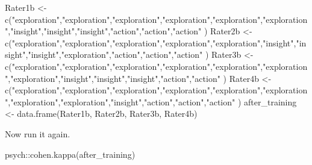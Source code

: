 \documentclass[
  english,
]{book}
\newenvironment{Shaded}{\begin{snugshade}}{\end{snugshade}}
\newcommand{\FunctionTok}[1]{\textcolor[rgb]{0.00,0.00,0.00}{#1}}
\newcommand{\NormalTok}[1]{#1}
\newcommand{\OtherTok}[1]{\textcolor[rgb]{0.56,0.35,0.01}{#1}}
\newcommand{\SpecialCharTok}[1]{\textcolor[rgb]{0.00,0.00,0.00}{#1}}
\newcommand{\StringTok}[1]{\textcolor[rgb]{0.31,0.60,0.02}{#1}}
\begin{document}
\begin{Shaded}
\begin{Highlighting}[]
\NormalTok{Rater1b }\OtherTok{\textless{}{-}} \FunctionTok{c}\NormalTok{(}\StringTok{"exploration"}\NormalTok{,}\StringTok{"exploration"}\NormalTok{,}\StringTok{"exploration"}\NormalTok{,}\StringTok{"exploration"}\NormalTok{,}\StringTok{"exploration"}\NormalTok{,}\StringTok{"exploration"}\NormalTok{,}\StringTok{"insight"}\NormalTok{,}\StringTok{"insight"}\NormalTok{,}\StringTok{"insight"}\NormalTok{,}\StringTok{"action"}\NormalTok{,}\StringTok{"action"}\NormalTok{,}\StringTok{"action"}\NormalTok{ )}
\NormalTok{Rater2b }\OtherTok{\textless{}{-}} \FunctionTok{c}\NormalTok{(}\StringTok{"exploration"}\NormalTok{,}\StringTok{"exploration"}\NormalTok{,}\StringTok{"exploration"}\NormalTok{,}\StringTok{"exploration"}\NormalTok{,}\StringTok{"exploration"}\NormalTok{,}\StringTok{"insight"}\NormalTok{,}\StringTok{"insight"}\NormalTok{,}\StringTok{"insight"}\NormalTok{,}\StringTok{"exploration"}\NormalTok{,}\StringTok{"action"}\NormalTok{,}\StringTok{"action"}\NormalTok{,}\StringTok{"action"}\NormalTok{ )}
\NormalTok{Rater3b }\OtherTok{\textless{}{-}} \FunctionTok{c}\NormalTok{(}\StringTok{"exploration"}\NormalTok{,}\StringTok{"exploration"}\NormalTok{,}\StringTok{"exploration"}\NormalTok{,}\StringTok{"exploration"}\NormalTok{,}\StringTok{"exploration"}\NormalTok{,}\StringTok{"exploration"}\NormalTok{,}\StringTok{"exploration"}\NormalTok{,}\StringTok{"insight"}\NormalTok{,}\StringTok{"insight"}\NormalTok{,}\StringTok{"insight"}\NormalTok{,}\StringTok{"action"}\NormalTok{,}\StringTok{"action"}\NormalTok{ )}
\NormalTok{Rater4b }\OtherTok{\textless{}{-}} \FunctionTok{c}\NormalTok{(}\StringTok{"exploration"}\NormalTok{,}\StringTok{"exploration"}\NormalTok{,}\StringTok{"exploration"}\NormalTok{,}\StringTok{"exploration"}\NormalTok{,}\StringTok{"exploration"}\NormalTok{,}\StringTok{"exploration"}\NormalTok{,}\StringTok{"exploration"}\NormalTok{,}\StringTok{"exploration"}\NormalTok{,}\StringTok{"insight"}\NormalTok{,}\StringTok{"action"}\NormalTok{,}\StringTok{"action"}\NormalTok{,}\StringTok{"action"}\NormalTok{ )}
\NormalTok{after\_training }\OtherTok{\textless{}{-}} \FunctionTok{data.frame}\NormalTok{(Rater1b, Rater2b, Rater3b, Rater4b)}
\end{Highlighting}
\end{Shaded}

Now run it again.

\begin{Shaded}
\begin{Highlighting}[]
\NormalTok{psych}\SpecialCharTok{::}\FunctionTok{cohen.kappa}\NormalTok{(after\_training)}
\end{Highlighting}
\end{Shaded}
\end{document}
